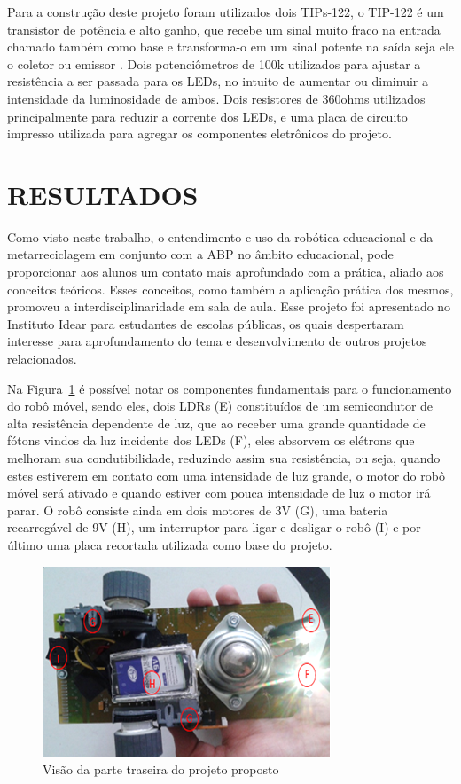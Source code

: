 \documentclass[a0,portrait,brazil]{a0poster}
\begin{document}
\begin{multicols}{3}
\begin{large}
Para a construção deste projeto foram utilizados dois TIPs-122, o TIP-122 é um transistor de potência e alto ganho, que recebe um sinal muito fraco na entrada chamado também como base e transforma-o em um sinal potente na saída seja ele o coletor ou emissor \cite{fairchild}. Dois potenciômetros de 100k utilizados para ajustar a resistência a ser passada para os LEDs, no intuito de aumentar ou diminuir a intensidade da luminosidade de ambos. Dois resistores de 360ohms utilizados principalmente para reduzir a corrente dos LEDs, e uma placa de circuito impresso utilizada para agregar os componentes eletrônicos do projeto.



\color{black}
\section*{RESULTADOS}

Como visto neste trabalho, o entendimento e uso da robótica educacional e da metarreciclagem em conjunto com a ABP no âmbito educacional, pode proporcionar aos alunos um contato mais aprofundado com a prática, aliado aos conceitos teóricos. Esses conceitos, como também a aplicação prática dos mesmos, promoveu a interdisciplinaridade em sala de aula. Esse projeto foi apresentado no Instituto Idear para estudantes de escolas públicas, os quais despertaram interesse para aprofundamento do tema e desenvolvimento de outros projetos relacionados.
\medskip

Na Figura~\ref{fig:fig2} é possível notar os componentes fundamentais para o funcionamento do robô móvel, sendo eles, dois LDRs (E) constituídos de um semicondutor de alta resistência dependente de luz, que ao receber uma grande quantidade de fótons vindos da luz incidente dos LEDs (F), eles absorvem os elétrons que melhoram sua condutibilidade, reduzindo assim sua resistência, ou seja, quando estes estiverem em contato com uma intensidade de luz grande, o motor do robô móvel será ativado e quando estiver com pouca intensidade de luz o motor irá parar. O robô consiste ainda em dois motores de 3V (G), uma bateria recarregável de 9V (H), um interruptor para ligar e desligar o robô (I) e por último uma placa recortada utilizada como base do projeto.
\medskip

\begin{figure}[H]
\centering
\includegraphics[width=.25\textwidth]{figures/SEMIC2.png}
\caption{Visão da parte traseira do projeto proposto}
\label{fig:fig2}
\end{figure}


\end{large}
\end{multicols}
\end{document}
